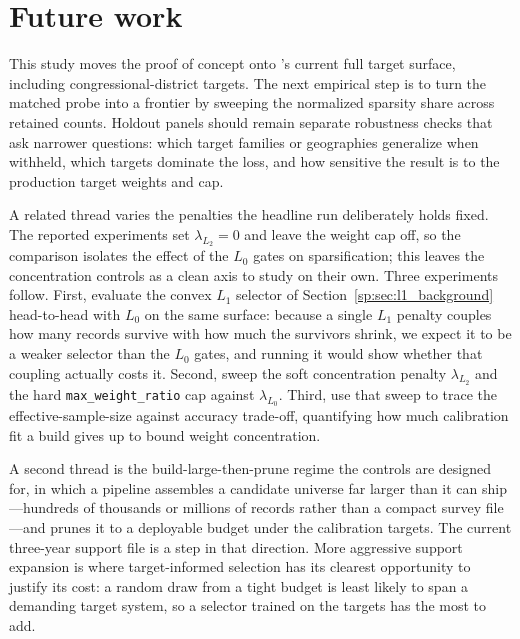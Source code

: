 \section{Future work}
\label{sp:sec:future_work}

This study moves the proof of concept onto \populace{}'s current full target surface, including
congressional-district targets. The next empirical step is to turn the matched probe into a frontier by
sweeping the normalized sparsity share across retained counts. Holdout panels should remain separate
robustness checks that ask narrower
questions: which target families or geographies generalize when withheld, which targets dominate the loss,
and how sensitive the result is to the production target weights and cap.

A related thread varies the penalties the headline run deliberately holds fixed. The reported experiments
set $\lambda_{L_2}=0$ and leave the weight cap off, so the comparison isolates the effect of the $L_0$
gates on sparsification; this leaves the concentration controls as a clean axis to study on their own.
Three experiments follow. First, evaluate the convex $L_1$ selector of Section~\ref{sp:sec:l1_background}
head-to-head with $L_0$ on the same surface: because a single $L_1$ penalty couples how many records
survive with how much the survivors shrink, we expect it to be a weaker selector than the $L_0$ gates,
and running it would show whether that coupling actually costs it. Second, sweep the soft concentration
penalty $\lambda_{L_2}$ and the hard \texttt{max\_weight\_ratio} cap against $\lambda_{L_0}$. Third, use
that sweep to trace the effective-sample-size against accuracy trade-off, quantifying how much calibration
fit a build gives up to bound weight concentration.

A second thread is the build-large-then-prune regime the controls are designed for, in which a pipeline
assembles a candidate universe far larger than it can ship---hundreds of thousands or millions of records
rather than a compact survey file---and prunes it to a deployable budget under the calibration targets.
The current three-year support file is a step in that direction. More aggressive support expansion is
where target-informed selection has its clearest opportunity to justify its cost: a random draw from a
tight budget is least likely to span a demanding target system, so a selector trained on the targets has
the most to add.

